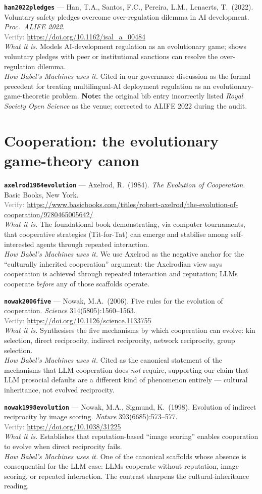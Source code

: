 \documentclass[11pt,a4paper]{article}
\newcommand{\entry}[5]{%
  \par\smallskip
  \noindent\textbf{\texttt{#1}} --- #2\\
  {\footnotesize \textcolor{gray}{Verify:} \url{#3}}\\
  \textit{What it is.} #4\\
  \textit{How Babel's Machines uses it.} #5
  \par\medskip
}
\begin{document}
\entry{han2022pledges}
{Han, T.A., Santos, F.C., Pereira, L.M., Lenaerts, T.\ (2022). Voluntary safety pledges overcome over-regulation dilemma in AI development. \emph{Proc.\ ALIFE 2022}.}
{https://doi.org/10.1162/isal_a_00484}
{Models AI-development regulation as an evolutionary game; shows voluntary pledges with peer or institutional sanctions can resolve the over-regulation dilemma.}
{Cited in our governance discussion as the formal precedent for treating multilingual-AI deployment regulation as an evolutionary-game-theoretic problem. \textbf{Note:} the original bib entry incorrectly listed \emph{Royal Society Open Science} as the venue; corrected to ALIFE 2022 during the audit.}

\section{Cooperation: the evolutionary game-theory canon}

\entry{axelrod1984evolution}
{Axelrod, R.\ (1984). \emph{The Evolution of Cooperation}. Basic Books, New York.}
{https://www.basicbooks.com/titles/robert-axelrod/the-evolution-of-cooperation/9780465005642/}
{The foundational book demonstrating, via computer tournaments, that cooperative strategies (Tit-for-Tat) can emerge and stabilise among self-interested agents through repeated interaction.}
{We use Axelrod as the negative anchor for the ``culturally inherited cooperation'' argument: the Axelrodian view says cooperation is achieved through repeated interaction and reputation; LLMs cooperate \emph{before} any of those scaffolds operate.}

\entry{nowak2006five}
{Nowak, M.A.\ (2006). Five rules for the evolution of cooperation. \emph{Science} 314(5805):1560--1563.}
{https://doi.org/10.1126/science.1133755}
{Synthesises the five mechanisms by which cooperation can evolve: kin selection, direct reciprocity, indirect reciprocity, network reciprocity, group selection.}
{Cited as the canonical statement of the mechanisms that LLM cooperation does \emph{not} require, supporting our claim that LLM prosocial defaults are a different kind of phenomenon entirely --- cultural inheritance, not evolved reciprocity.}

\entry{nowak1998evolution}
{Nowak, M.A., Sigmund, K.\ (1998). Evolution of indirect reciprocity by image scoring. \emph{Nature} 393(6685):573--577.}
{https://doi.org/10.1038/31225}
{Establishes that reputation-based ``image scoring'' enables cooperation to evolve when direct reciprocity fails.}
{One of the canonical scaffolds whose absence is consequential for the LLM case: LLMs cooperate without reputation, image scoring, or repeated interaction. The contrast sharpens the cultural-inheritance reading.}
\end{document}
